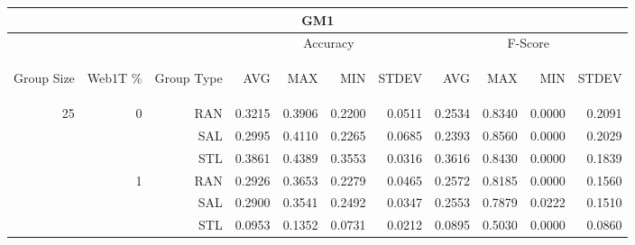 \begin{center}
\begin{table}[htbp] 
 \begin{center}
\begin{tabular}{ | r | r | r | r | r | r | r | r | r | r | r |}
\hline
\multicolumn{11}{|c|}{GM1}\\
\hline
 & & & \multicolumn{4}{|c|}{Accuracy} & \multicolumn{4}{|c|}{F-Score}\\ \cline{4-11}
\begin{sideways}Group Size\end{sideways} & \begin{sideways}Web1T \%\end{sideways} & \begin{sideways}Group Type\end{sideways} & \begin{sideways}AVG\end{sideways} & \begin{sideways}MAX\end{sideways} & \begin{sideways}MIN\end{sideways} & \begin{sideways}STDEV\end{sideways} & \begin{sideways}AVG\end{sideways} & \begin{sideways}MAX\end{sideways} & \begin{sideways}MIN\end{sideways} & \begin{sideways}STDEV\end{sideways}\\
\hline
\multirow{18}{*}{25}
 & \multirow{3}{*}{0} & RAN & 0.3215 & 0.3906 & 0.2200 & 0.0511 & 0.2534 & 0.8340 & 0.0000 & 0.2091\\ \cline{3-11}
 &   & SAL & 0.2995 & 0.4110 & 0.2265 & 0.0685 & 0.2393 & 0.8560 & 0.0000 & 0.2029\\ \cline{3-11}
 &   & STL & 0.3861 & 0.4389 & 0.3553 & 0.0316 & 0.3616 & 0.8430 & 0.0000 & 0.1839\\ \cline{2-11}
 & \multirow{3}{*}{1} & RAN & 0.2926 & 0.3653 & 0.2279 & 0.0465 & 0.2572 & 0.8185 & 0.0000 & 0.1560\\ \cline{3-11}
 &   & SAL & 0.2900 & 0.3541 & 0.2492 & 0.0347 & 0.2553 & 0.7879 & 0.0222 & 0.1510\\ \cline{3-11}
 &   & STL & 0.0953 & 0.1352 & 0.0731 & 0.0212 & 0.0895 & 0.5030 & 0.0000 & 0.0860\\ \cline{2-11}

\end{tabular}
\end{center}
\end{table}
\end{center}
